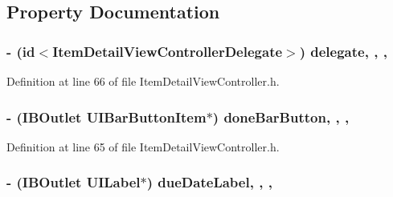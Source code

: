 \subsection{Property Documentation}
\hypertarget{interface_item_detail_view_controller_ae9c5ccea3662c42762ebea34efb210a4}{
\subsubsection[{delegate}]{\setlength{\rightskip}{0pt plus 5cm}-\/ (id$<${\bf Item\-Detail\-View\-Controller\-Delegate}$>$) delegate\hspace{0.3cm}{\ttfamily [read]}, {\ttfamily [write]}, {\ttfamily [nonatomic]}, {\ttfamily [weak]}}}\label{interface_item_detail_view_controller_ae9c5ccea3662c42762ebea34efb210a4}


Definition at line 66 of file Item\-Detail\-View\-Controller.\-h.

\hypertarget{interface_item_detail_view_controller_a51351cd76f2e2c1d0ed3075e191a5f2f}{
\subsubsection[{done\-Bar\-Button}]{\setlength{\rightskip}{0pt plus 5cm}-\/ (I\-B\-Outlet U\-I\-Bar\-Button\-Item$\ast$) done\-Bar\-Button\hspace{0.3cm}{\ttfamily [read]}, {\ttfamily [write]}, {\ttfamily [nonatomic]}, {\ttfamily [strong]}}}\label{interface_item_detail_view_controller_a51351cd76f2e2c1d0ed3075e191a5f2f}


Definition at line 65 of file Item\-Detail\-View\-Controller.\-h.

\hypertarget{interface_item_detail_view_controller_ac5b2da2282bfc3b13d40a0c143c82799}{
\subsubsection[{due\-Date\-Label}]{\setlength{\rightskip}{0pt plus 5cm}-\/ (I\-B\-Outlet U\-I\-Label$\ast$) due\-Date\-Label\hspace{0.3cm}{\ttfamily [read]}, {\ttfamily [write]}, {\ttfamily [nonatomic]}, {\ttfamily [strong]}}}\label{interface_item_detail_view_controller_ac5b2da2282bfc3b13d40a0c143c82799}


